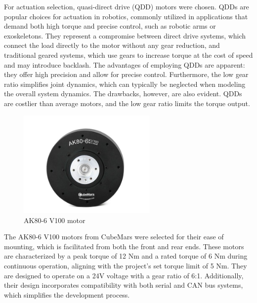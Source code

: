 For actuation selection, quasi-direct drive (QDD) motors were chosen. QDDs are popular choices for actuation in robotics, commonly utilized in applications that demand both high torque and precise control, such as robotic arms or exoskeletons. They represent a compromise between direct drive systems, which connect the load directly to the motor without any gear reduction, and traditional geared systems, which use gears to increase torque at the cost of speed and may introduce backlash. The advantages of employing QDDs are apparent: they offer high precision and allow for precise control. Furthermore, the low gear ratio simplifies joint dynamics, which can typically be neglected when modeling the overall system dynamics. The drawbacks, however, are also evident. QDDs are costlier than average motors, and the low gear ratio limits the torque output.

\begin{figure}[H]
  \centering
  \includegraphics[width=0.6\textwidth]{figures/hardware_setup/motor.jpg}
  \caption{AK80-6 V100 motor\cite{cubemarsAK806}}
  \label{fig:AK80-6}
\end{figure}

The AK80-6 V100 motors from CubeMars were selected for their ease of mounting, which is facilitated from both the front and rear ends\cite{cubemarsAK806}. These motors are characterized by a peak torque of 12 Nm and a rated torque of 6 Nm during continuous operation, aligning with the project's set torque limit of 5 Nm. They are designed to operate on a 24V voltage with a gear ratio of 6:1. Additionally, their design incorporates compatibility with both serial and CAN bus systems, which simplifies the development process.

